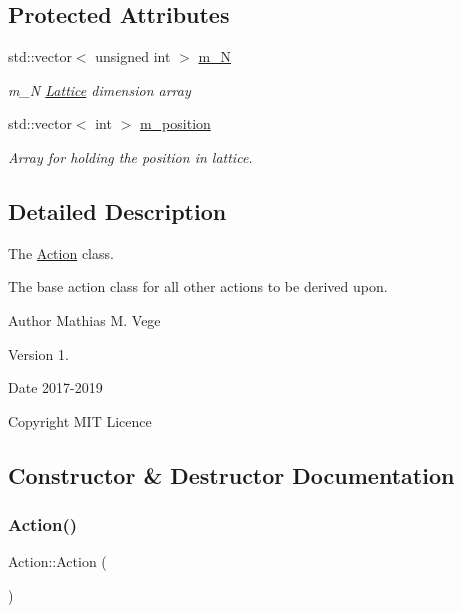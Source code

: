 \subsection*{Protected Attributes}
\begin{DoxyCompactItemize}
\item 
std\+::vector$<$ unsigned int $>$ \mbox{\hyperlink{class_action_a80654d2311707f24689cd9e480edb2f6}{m\+\_\+N}}
\begin{DoxyCompactList}\small\item\em m\+\_\+N \mbox{\hyperlink{class_lattice}{Lattice}} dimension array \end{DoxyCompactList}\item 
std\+::vector$<$ int $>$ \mbox{\hyperlink{class_action_a133fd17c83db233423855178bc81fb16}{m\+\_\+position}}
\begin{DoxyCompactList}\small\item\em Array for holding the position in lattice. \end{DoxyCompactList}\end{DoxyCompactItemize}


\subsection{Detailed Description}
The \mbox{\hyperlink{class_action}{Action}} class. 

The base action class for all other actions to be derived upon.

\begin{DoxyAuthor}{Author}
Mathias M. Vege 
\end{DoxyAuthor}
\begin{DoxyVersion}{Version}
1. 
\end{DoxyVersion}
\begin{DoxyDate}{Date}
2017-\/2019 
\end{DoxyDate}
\begin{DoxyCopyright}{Copyright}
M\+IT Licence 
\end{DoxyCopyright}


\subsection{Constructor \& Destructor Documentation}
\mbox{\label{class_action_a4f457ccfc8336b565cadca56b36e0271}} 
\subsubsection{\texorpdfstring{Action()}{Action()}}
{\footnotesize\ttfamily Action\+::\+Action (\begin{DoxyParamCaption}{ }\end{DoxyParamCaption})}



